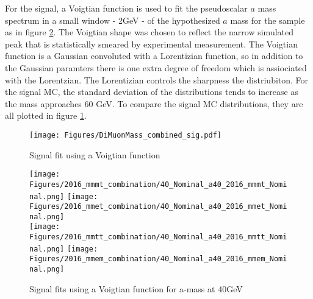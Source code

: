 
For the signal, a Voigtian function is used to fit the pseudoscalar $a$ mass spectrum in a small window - 2GeV - of the hypothesized $a$ mass for the sample as in figure \ref{fig:fit_sig}. The Voigtian shape was chosen to reflect the narrow simulated peak that is statistically smeared by experimental measurement. The Voigtian function is a Gaussian convoluted with a Lorentizian function, so in addition to the Gaussian paramters there is one extra degree of freedom which is assiociated with the Lorentzian. The Lorentizian controls the sharpness the distriubiton.  
For the signal MC, the standard deviation of the distributions tends to increase as the mass approaches 60 GeV. 
To compare the signal MC distributions, they are all plotted in figure \ref{fig:fit_sig_all}.


\begin{figure}[ht!b]
    \centering 
    \texttt{[image: Figures/DiMuonMass\_combined\_sig.pdf]}
    \caption{\label{fig:fit_sig_all} Signal fit using a Voigtian function}
\end{figure}
\begin{figure}[ht!b]
  \centering
  \texttt{[image: Figures/2016\_mmmt\_combination/40\_Nominal\_a40\_2016\_mmmt\_Nominal.png]}
  \texttt{[image: Figures/2016\_mmet\_combination/40\_Nominal\_a40\_2016\_mmet\_Nominal.png]}\\
  \texttt{[image: Figures/2016\_mmtt\_combination/40\_Nominal\_a40\_2016\_mmtt\_Nominal.png]}
  \texttt{[image: Figures/2016\_mmem\_combination/40\_Nominal\_a40\_2016\_mmem\_Nominal.png]}\\
    \caption{\label{fig:fit_sig} Signal fits using a Voigtian function for a-mass at 40GeV }
\end{figure}

